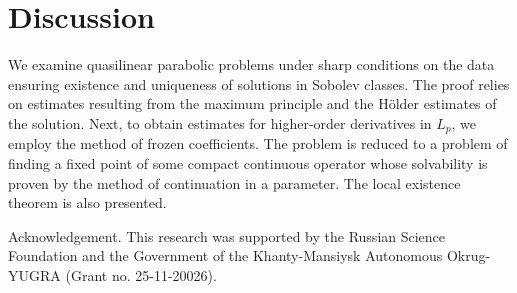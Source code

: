 \documentclass{article}
\theoremstyle{plain}
\begin{document}
\section{Discussion}

We examine quasilinear parabolic problems under 
sharp conditions on the data ensuring existence and uniqueness of solutions in Sobolev
classes. The proof relies on estimates resulting from the maximum principle and the H\"{o}lder estimates of the solution. 
 Next, to obtain estimates for higher-order derivatives in $L_p$, we employ the method  of frozen coefficients. 
 The problem is reduced to a problem of finding a fixed point of some compact continuous operator whose solvability is proven  
 by the method of continuation in a parameter.  The local existence theorem is also presented.
  



\vspace{6pt}




Acknowledgement. This research was supported by the Russian Science Foundation and the Government of the
Khanty-Mansiysk Autonomous Okrug-YUGRA (Grant no. 25-11-20026).





\end{document}

